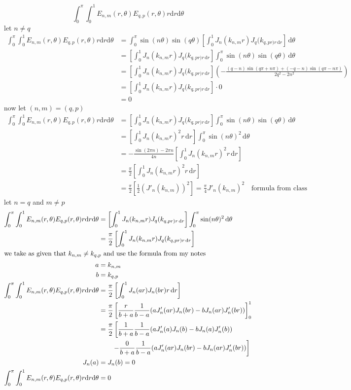 \documentclass{article}
\begin{document}
  \[\int_0^\pi{\int_0^1{E_{n,m}(r,\theta)E_{q,p}(r,\theta)r\mathrm{d}r\mathrm{d}\theta}}\]
let $n\ne q$
\begin{align*}
   \int_0^\pi{\int_0^1{E_{n,m}(r,\theta)E_{q,p}(r,\theta)r\mathrm{d}r\mathrm{d}\theta}}&=
   \int_0^\pi{\sin(n\theta)\sin(q\theta)\left[\int_0^1{J_n(k_{n,m}r)J_q(k_{q,pr)r\,\mathrm{d}r}}\right]\,\mathrm{d}\theta}\\
   &=\left[\int_0^1{J_n(k_{n,m}r)J_q(k_{q,pr)r\,\mathrm{d}r}}\right]\int_0^\pi{\sin(n\theta)\sin(q\theta)\,\mathrm{d}\theta}\\
   &=\left[\int_0^1{J_n(k_{n,m}r)J_q(k_{q,pr)r\,\mathrm{d}r}}\right]\left(-\frac{(q-n)\sin(q\pi+n\pi)+(-q-n)\sin(q\pi-n\pi)}{2q^2-2n^2}\right)\\
   &=\left[\int_0^1{J_n(k_{n,m}r)J_q(k_{q,pr)r\,\mathrm{d}r}}\right]\cdot 0\\
   &=0
\end{align*}
now let $(n,m)=(q,p)$
\begin{align*}
   \int_0^\pi{\int_0^1{E_{n,m}(r,\theta)E_{q,p}(r,\theta)r\mathrm{d}r\mathrm{d}\theta}}&=
   \left[\int_0^1{J_n(k_{n,m}r)J_q(k_{q,pr)r\,\mathrm{d}r}}\right]\int_0^\pi{\sin(n\theta)\sin(q\theta)\,\mathrm{d}\theta}\\
   &=\left[\int_0^1{J_n(k_{n,m}r)^2r\,\mathrm{d}r}\right]\int_0^\pi{\sin(n\theta)^2\,\mathrm{d}\theta}\\
   &=-\frac{\sin(2\pi n)-2\pi n}{4n}\left[\int_0^1{J_n(k_{n,m}r)^2r\,\mathrm{d}r}\right]\\
   &=\frac{\pi}{2}\left[\int_0^1{J_n(k_{n,m}r)^2r\,\mathrm{d}r}\right]\\
   &=\frac{\pi}{2}\left[\frac{1}{2}(J'_n(k_{n,m}))^2\right]=
   \frac{\pi}{4}J'_n(k_{n,m})^2 \quad\text{formula from class}
\end{align*}
let $n=q$ and $m\ne p$
\begin{align*}
   \int_0^\pi{\int_0^1{E_{n,m}(r,\theta)E_{q,p}(r,\theta)r\mathrm{d}r\mathrm{d}\theta}}&=
   \left[\int_0^1{J_n(k_{n,m}r)J_q(k_{q,pr)r\,\mathrm{d}r}}\right]\int_0^\pi{\sin(n\theta)^2\,\mathrm{d}\theta}\\
   &=\frac{\pi}{2}\left[\int_0^1{J_n(k_{n,m}r)J_q(k_{q,pr)r\,\mathrm{d}r}}\right]\\
   \intertext{we take as given that $k_{n,m}\ne k_{q,p}$ and use the formula from my notes}
   a&=k_{n,m}\\
   b&=k_{q,p}\\
   \int_0^\pi{\int_0^1{E_{n,m}(r,\theta)E_{q,p}(r,\theta)r\mathrm{d}r\mathrm{d}\theta}}&=
   \frac{\pi}{2}\left[\int_0^1{J_n(ar)J_n(br)r\,\mathrm{d}r}\right]\\
   &=\frac{\pi}{2}\left[\frac{r}{b+a}\frac{1}{b-a}(aJ'_n(ar)J_n(br)-bJ_n(ar)J'_n(br))\right]_0^1\\
   &=\frac{\pi}{2}\left[\frac{1}{b+a}\frac{1}{b-a}(aJ'_n(a)J_n(b)-bJ_n(a)J'_n(b))\right.\\
   &\qquad\left.-\frac{0}{b+a}\frac{1}{b-a}(aJ'_n(ar)J_n(br)-bJ_n(ar)J'_n(br))\right]\\
  J_n(a)&=J_n(b)=0\\
   \int_0^\pi{\int_0^1{E_{n,m}(r,\theta)E_{q,p}(r,\theta)r\mathrm{d}r\mathrm{d}\theta}}&=0
\end{align*}
\end{document}
